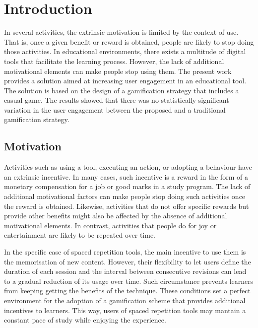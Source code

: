 
\chapter{Introduction} %

\label{intro} %


In several activities, the extrinsic motivation is limited by the context of use. That is, once a given benefit or reward is obtained, people are likely to stop doing those activities. In educational environments, there exists a multitude of digital tools that facilitate the learning process. However, the lack of additional motivational elements can make people stop using them. The present work provides a solution aimed at increasing user engagement in an educational tool. The solution is based on the design of a gamification strategy that includes a casual game. The results showed that there was no statistically significant variation in the user engagement between the proposed and a traditional gamification strategy.

\section{Motivation}
Activities such as using a tool, executing an action, or adopting a behaviour have an extrinsic incentive. In many cases, such incentive is a reward in the form of a monetary compensation for a job or good marks in a study program. The lack of additional motivational factors can make people stop doing such activities once the reward is obtained. Likewise, activities that do not offer specific rewards but provide other benefits might also be affected by the absence of additional motivational elements. In contrast, activities that people do for joy or entertainment are likely to be repeated over time.

In the specific case of spaced repetition tools, the main incentive to use them is the memorisation of new content. However, their flexibility to let users define the duration of each session and the interval between consecutive revisions can lead to a gradual reduction of its usage over time. Such circumstance prevents learners from keeping getting the benefits of the technique. These conditions set a perfect environment for the adoption of a gamification scheme that provides additional incentives to learners. This way, users of spaced repetition tools may mantain a constant pace of study while enjoying the experience.

